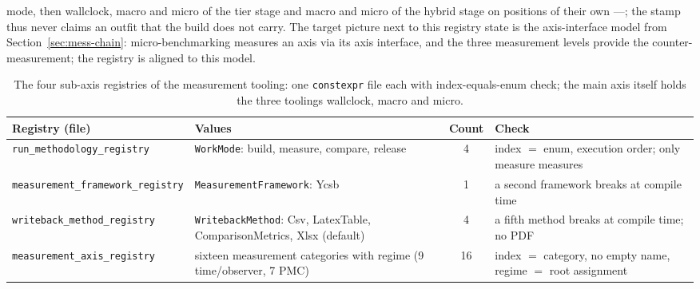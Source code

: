 \begin{nurlang}
mode, then wallclock, macro and micro of the tier stage and macro and micro of the hybrid stage on
positions of their own ---; the stamp thus never claims an outfit that the build does not carry. The
target picture next to this registry state is the axis-interface model from
Section~\ref{sec:mess-chain}: micro-benchmarking measures an axis via its axis interface, and the three
measurement levels provide the counter-measurement; the registry is aligned to this model.
\begin{table}[htbp]\centering\footnotesize
\begin{tabular}{@{}p{3.0cm}p{4.6cm}cp{4.0cm}@{}}
\toprule
Registry (file) & Values & Count & Check \\
\midrule
\texttt{run\_\allowbreak{}methodology\_\allowbreak{}registry} & \texttt{WorkMode}: build, measure, compare, release & 4 & index $=$ enum, execution order; only measure measures \\
\texttt{measurement\_\allowbreak{}framework\_\allowbreak{}registry} & \texttt{MeasurementFramework}: Ycsb & 1 & a second framework breaks at compile time \\
\texttt{writeback\_\allowbreak{}method\_\allowbreak{}registry} & \texttt{WritebackMethod}: Csv, LatexTable, ComparisonMetrics, Xlsx (default) & 4 & a fifth method breaks at compile time; no PDF \\
\texttt{measurement\_\allowbreak{}axis\_\allowbreak{}registry} & sixteen measurement categories with regime (9 time/observer, 7 PMC) & 16 & index $=$ category, no empty name, regime $=$ root assignment \\
\bottomrule
\end{tabular}
\caption{The four sub-axis registries of the measurement tooling: one \texttt{constexpr} file each with
index-equals-enum check; the main axis itself holds the three toolings wallclock, macro and
micro.}\label{tab:mess-registries}
\end{table}
\end{nurlang}
